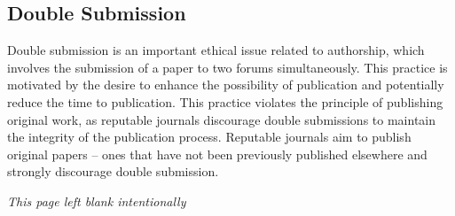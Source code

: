 \documentclass{article}
\begin{document}
	\subsection{Double Submission}
	Double submission is an important ethical issue related to authorship, which involves the submission of a
	paper to two forums simultaneously.
	This practice is motivated by the desire to enhance the possibility of publication and potentially reduce
	the time to publication.
	This practice violates the principle of publishing original work, as reputable journals discourage double
	submissions to maintain the integrity of the publication process.
	Reputable journals aim to publish original papers -- ones that have not been previously published
	elsewhere and strongly discourage double submission.

	\newpage
	\vspace*{\fill}
		\centering \large \emph{This page left blank intentionally}
	\vspace*{\fill}
\end{document}

